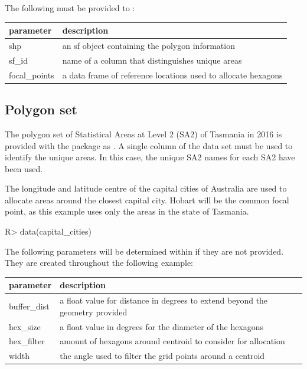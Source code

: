 \documentclass[
]{jss}
\begin{document}
The following must be provided to :

\begin{CodeChunk}

\begin{tabular}{l|l}
\hline
parameter & description\\
\hline
shp & an sf object containing the polygon information\\
\hline
sf\_id & name of a column that distinguishes unique areas\\
\hline
focal\_points & a data frame of reference locations used to allocate hexagons\\
\hline
\end{tabular}

\end{CodeChunk}

\hypertarget{polygon-set}{%
\subsection{Polygon set}\label{polygon-set}}

The polygon set of Statistical Areas at Level 2 (SA2) \citep{abs2016} of
Tasmania in 2016 is provided with the  package as
. A single column of the data set must be used to identify
the unique areas. In this case, the unique SA2 names for each SA2 have
been used.

The longitude and latitude centre of the capital cities of Australia are
used to allocate areas around the closest capital city. Hobart will be
the common focal point, as this example uses only the areas in the state
of Tasmania.

\begin{CodeChunk}

\begin{CodeInput}
R> data(capital_cities)
\end{CodeInput}
\end{CodeChunk}

The following parameters will be determined within 
if they are not provided. They are created throughout the following
example:

\begin{CodeChunk}

\begin{tabular}{l|l}
\hline
parameter & description\\
\hline
buffer\_dist & a float value for distance in degrees to extend beyond the geometry provided\\
\hline
hex\_size & a float value in degrees for the diameter of the hexagons\\
\hline
hex\_filter & amount of hexagons around centroid to consider for allocation\\
\hline
width & the angle used to filter the grid points around a centroid\\
\hline
\end{tabular}

\end{CodeChunk}
\end{document}
